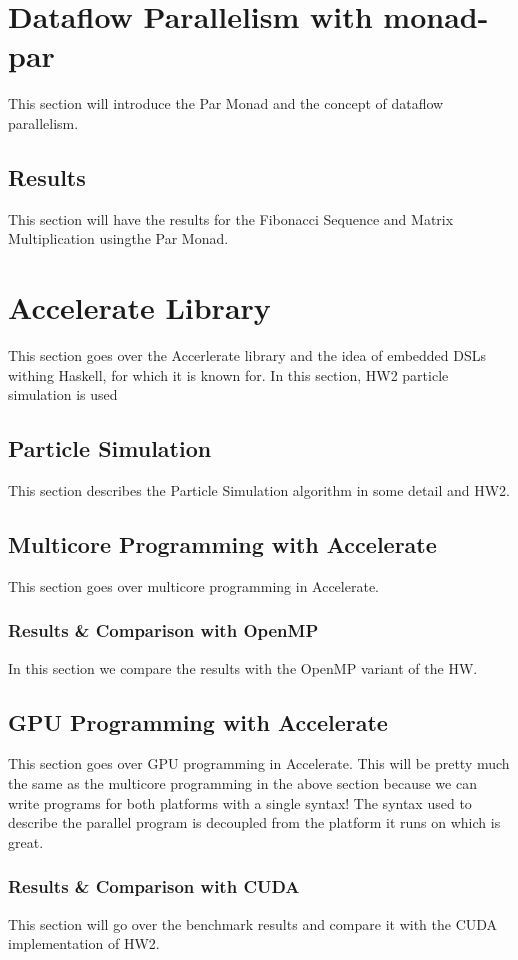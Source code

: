\documentclass[a4paper, 12pt]{article}
\begin{document}
\section{Dataflow Parallelism with monad-par}
This section will introduce the Par Monad and the concept of dataflow parallelism.

\subsection{Results}
This section will have the results for the Fibonacci Sequence and Matrix Multiplication usingthe Par Monad.

\section{Accelerate Library}
This section goes over the Accerlerate library and the idea of embedded DSLs withing Haskell, for which it
 is known for. In this section, HW2 particle simulation is used

\subsection{Particle Simulation}
This section describes the Particle Simulation algorithm in some detail and HW2.

\subsection{Multicore Programming with Accelerate}
This section goes over multicore programming in Accelerate.

\subsubsection{Results \& Comparison with OpenMP}
In this section we compare the results with the OpenMP variant of the HW.

\subsection{GPU Programming with Accelerate}
This section goes over GPU programming in Accelerate. This will be pretty much the same
as the multicore programming in the above section because we can write programs for both platforms
with a single syntax! The syntax used to describe the parallel program is decoupled from the platform it runs on which is great.


\subsubsection{Results \& Comparison with CUDA}
This section will go over the benchmark results and compare it with the CUDA implementation of HW2.
\end{document}
